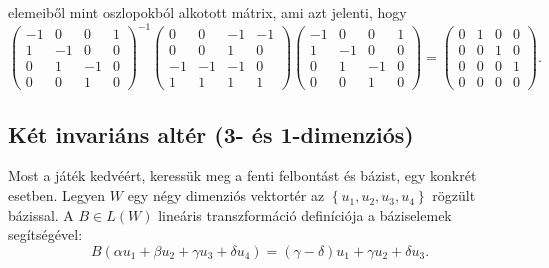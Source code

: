 \documentclass[9pt, a4paper, showtrims]{memoir}
\theoremstyle{plain}
\theoremstyle{remark}
\theoremstyle{definition}
\begin{document}
elemeiből mint oszlopokból alkotott mátrix, ami azt jelenti, hogy
\[
    \begin{pmatrix}
        -1&0&0&1\\
        1&-1&0&0\\
        0&1&-1&0\\
        0&0&1&0
    \end{pmatrix}^{-1}
    \begin{pmatrix}
        0 & 0 & -1&-1\\
        0 & 0 & 1 & 0\\
        -1 & -1& -1& 0\\
        1 & 1 & 1 & 1
    \end{pmatrix}
    \begin{pmatrix}
        -1&0&0&1\\
        1&-1&0&0\\
        0&1&-1&0\\
        0&0&1&0
    \end{pmatrix}
    =
    \begin{pmatrix}
        0&1&0&0\\
        0&0&1&0\\
        0&0&0&1\\
        0&0&0&0
    \end{pmatrix}.
\]
\subsection{Két invariáns altér (3- és 1-dimenziós)}
Most a játék kedvéért, keressük meg a fenti  felbontást és bázist, egy konkrét esetben.
Legyen $W$ egy négy dimenziós vektortér az $\left\{ u_1,u_2,u_3,u_4 \right\}$ rögzült bázissal.
A $B\in L\left( W \right)$ lineáris transzformáció definíciója a báziselemek segítségével:
\[
    B\left( \alpha u_1+\beta u_2 +\gamma u_3+\delta u_4 \right)
    =
    \left( \gamma-\delta \right)u_1+
    \gamma u_2+
    \delta u_3.
\]
\end{document}
